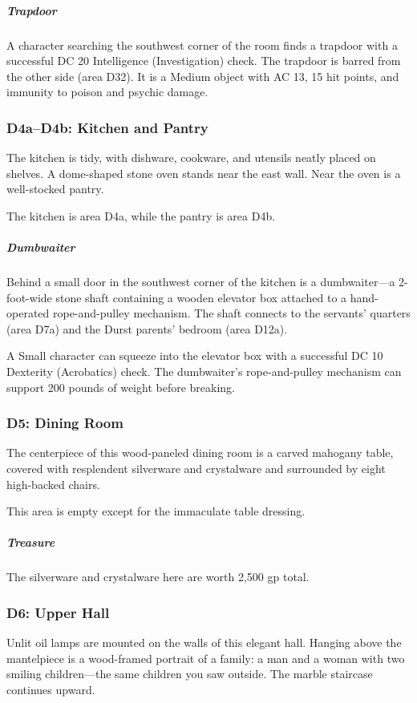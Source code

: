 \documentclass[10pt,a4paper,twoside,bg=print,twocolumn,openany,nodeprecatedcode]{dndbook}
\begin{document}
\subparagraph{Trapdoor}
A character searching the southwest corner of the room finds a trapdoor with a successful DC 20 Intelligence (Investigation) check. The trapdoor is barred from the other side (area D32). It is a Medium object with AC 13, 15 hit points, and immunity to poison and psychic damage.

\subsubsection{D4a–D4b: Kitchen and Pantry}
\begin{DndReadAloud}{}
The kitchen is tidy, with dishware, cookware, and utensils neatly placed on shelves. A dome-shaped stone oven stands near the east wall. Near the oven is a well-stocked pantry.

\end{DndReadAloud}

The kitchen is area D4a, while the pantry is area D4b.

\subparagraph{Dumbwaiter}
Behind a small door in the southwest corner of the kitchen is a dumbwaiter—a 2-foot-wide stone shaft containing a wooden elevator box attached to a hand-operated rope-and-pulley mechanism. The shaft connects to the servants' quarters (area D7a) and the Durst parents' bedroom (area D12a).

A Small character can squeeze into the elevator box with a successful DC 10 Dexterity (Acrobatics) check. The dumbwaiter's rope-and-pulley mechanism can support 200 pounds of weight before breaking.

\subsubsection{D5: Dining Room}
\begin{DndReadAloud}{}
The centerpiece of this wood-paneled dining room is a carved mahogany table, covered with resplendent silverware and crystalware and surrounded by eight high-backed chairs.

\end{DndReadAloud}

This area is empty except for the immaculate table dressing.

\subparagraph{Treasure}
The silverware and crystalware here are worth 2,500 gp total.

\subsubsection{D6: Upper Hall}
\begin{DndReadAloud}{}
Unlit oil lamps are mounted on the walls of this elegant hall. Hanging above the mantelpiece is a wood-framed portrait of a family: a man and a woman with two smiling children—the same children you saw outside. The marble staircase continues upward.

\end{DndReadAloud}
\end{document}
